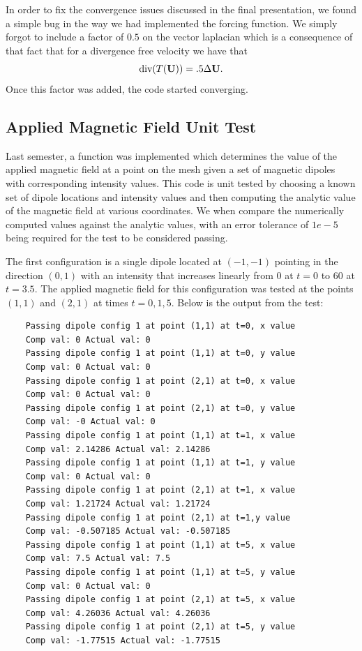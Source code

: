 \documentclass[11pt,fullpage]{article}
\newcommand{\lap}{\Delta}
\newcommand{\diver}{\textup{div} }
\theoremstyle{lemma}
\theoremstyle{definition}
\theoremstyle{lemma}
\begin{document}
In order to fix the convergence issues discussed in the final presentation, we found a simple bug in the way we had implemented the forcing function. We simply forgot to include a factor of $0.5$ on the vector laplacian which is a consequence of that fact that for a divergence free velocity we have that
$$
	\diver(T(\mathbf{U})) = .5 \lap \mathbf{U}.
$$
Once this factor was added, the code started converging.

\subsection{Applied Magnetic Field Unit Test}
Last semester, a function was implemented which determines the value of the applied magnetic field at a point on the mesh given a set of magnetic dipoles with corresponding intensity values. This code is unit tested by choosing a known set of dipole locations and intensity values and then computing the analytic value of the magnetic field at various coordinates. We when compare the numerically computed values against the analytic values, with an error tolerance of $1e-5$ being required for the test to be considered passing.

The first configuration is a single dipole located at $(-1,-1)$ pointing in the direction $(0,1)$ with an intensity that increases linearly from $0$ at $t=0$ to $60$ at $t=3.5$. The applied magnetic field for this configuration was tested at the points $(1,1)$ and $(2,1)$ at times $t=0,1,5$. Below is the output from the test:
\begin{verbatim}
	Passing dipole config 1 at point (1,1) at t=0, x value
	Comp val: 0 Actual val: 0
	Passing dipole config 1 at point (1,1) at t=0, y value
	Comp val: 0 Actual val: 0
	Passing dipole config 1 at point (2,1) at t=0, x value
	Comp val: 0 Actual val: 0
	Passing dipole config 1 at point (2,1) at t=0, y value
	Comp val: -0 Actual val: 0
	Passing dipole config 1 at point (1,1) at t=1, x value
	Comp val: 2.14286 Actual val: 2.14286
	Passing dipole config 1 at point (1,1) at t=1, y value
	Comp val: 0 Actual val: 0
	Passing dipole config 1 at point (2,1) at t=1, x value
	Comp val: 1.21724 Actual val: 1.21724
	Passing dipole config 1 at point (2,1) at t=1,y value
	Comp val: -0.507185 Actual val: -0.507185
	Passing dipole config 1 at point (1,1) at t=5, x value
	Comp val: 7.5 Actual val: 7.5
	Passing dipole config 1 at point (1,1) at t=5, y value
	Comp val: 0 Actual val: 0
	Passing dipole config 1 at point (2,1) at t=5, x value
	Comp val: 4.26036 Actual val: 4.26036
	Passing dipole config 1 at point (2,1) at t=5, y value
	Comp val: -1.77515 Actual val: -1.77515
\end{verbatim}
\end{document}
